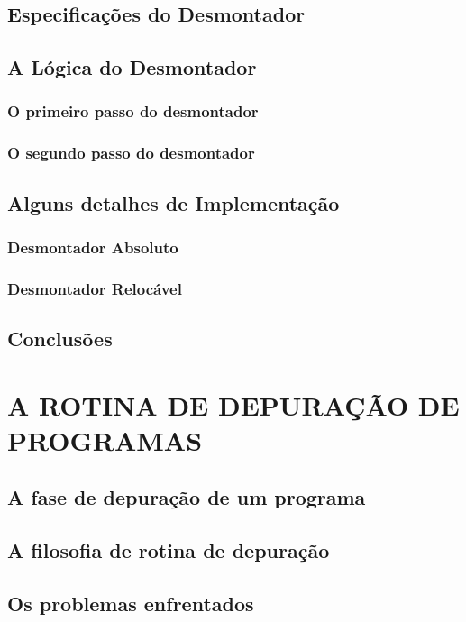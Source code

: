 \documentclass[a4paper,12pt]{article}
\begin{document}
\subsection{Especificações do Desmontador}

\subsection{A Lógica do Desmontador}
\subsubsection{O primeiro passo do desmontador}
\subsubsection{O segundo passo do desmontador}

\subsection{Alguns detalhes de Implementação}
\subsubsection{Desmontador Absoluto}
\subsubsection{Desmontador Relocável}

\subsection{Conclusões}

\section{A ROTINA DE DEPURAÇÃO DE PROGRAMAS}
\subsection{A fase de depuração de um programa}

\subsection{A filosofia de rotina de depuração}

\subsection{Os problemas enfrentados}
\end{document}
